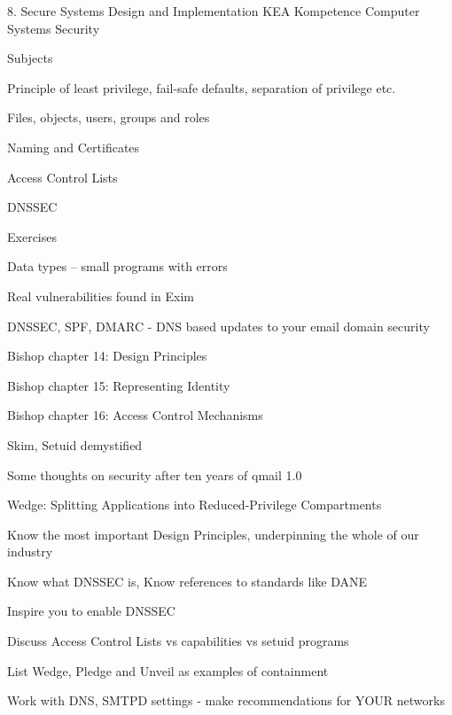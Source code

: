 \documentclass[Screen16to9,17pt]{foils}
\begin{document}
\mytitlepage
{8. Secure Systems Design and Implementation}
{KEA Kompetence Computer Systems Security}



\begin{list1}
\item Subjects
\begin{list2}
\item Principle of least privilege, fail-safe defaults, separation of privilege etc.
\item Files, objects, users, groups and roles
\item Naming and Certificates
\item Access Control Lists
\item DNSSEC
\end{list2}
\item Exercises
\begin{list2}
\item Data types -- small programs with errors
\item Real vulnerabilities found in Exim
\item DNSSEC, SPF, DMARC - DNS based updates to your email domain security
\end{list2}
\end{list1}




\begin{list1}
\item Bishop chapter 14: Design Principles
\item Bishop chapter 15: Representing Identity
\item Bishop chapter 16: Access Control Mechanisms
\item Skim, Setuid demystified
\item Some thoughts on security after ten years of qmail 1.0
\item Wedge: Splitting Applications into Reduced-Privilege Compartments
\end{list1}


 
\begin{list2}
\item Know the most important Design Principles, underpinning the whole of our industry
\item Know what DNSSEC is, Know references to standards like DANE
\item Inspire you to enable DNSSEC
\item Discuss Access Control Lists vs capabilities vs setuid programs
\item List Wedge, Pledge and Unveil as examples of containment
\item Work with DNS, SMTPD settings - make recommendations for YOUR networks
\end{list2}
\end{document}
